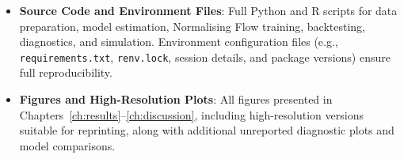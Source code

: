\documentclass[oneside,12pt]{CUEDthesisPSnPDF}
\begin{document}
\begin{itemize}
    \item \textbf{Source Code and Environment Files}:  
    Full Python and R scripts for data preparation, model estimation, Normalising Flow training, backtesting, diagnostics, and simulation. Environment configuration files (e.g., \texttt{requirements.txt}, \texttt{renv.lock}, session details, and package versions) ensure full reproducibility.

    \item \textbf{Figures and High-Resolution Plots}:  
    All figures presented in Chapters~\ref{ch:results}--\ref{ch:discussion}, including high-resolution versions suitable for reprinting, along with additional unreported diagnostic plots and model comparisons.
\end{itemize}

\renewcommand{\bibname}{References}


\end{document}
